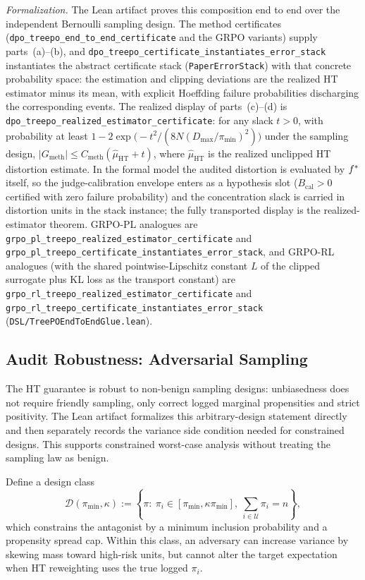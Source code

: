 \noindent\textit{Formalization.} The Lean artifact proves this composition end to end over the independent Bernoulli sampling design. The method certificates (\texttt{dpo\_treepo\_end\_to\_end\_certificate} and the GRPO variants) supply parts~(a)--(b), and \texttt{dpo\_treepo\_certificate\_instantiates\_error\_stack} instantiates the abstract certificate stack (\texttt{PaperErrorStack}) with that concrete probability space: the estimation and clipping deviations are the realized HT estimator minus its mean, with explicit Hoeffding failure probabilities discharging the corresponding events. The realized display of parts~(c)--(d) is \texttt{dpo\_treepo\_realized\_estimator\_certificate}: for any slack $t>0$, with probability at least $1-2\exp\!\big(-t^2/(8N(D_{\max}/\pi_{\min})^2)\big)$ under the sampling design, $|G_{\mathrm{meth}}| \le C_{\mathrm{meth}}(\hat{\mu}_{\mathrm{HT}} + t)$, where $\hat{\mu}_{\mathrm{HT}}$ is the realized unclipped HT distortion estimate. In the formal model the audited distortion is evaluated by $f^\ast$ itself, so the judge-calibration envelope enters as a hypothesis slot ($B_{\mathrm{cal}}>0$ certified with zero failure probability) and the concentration slack is carried in distortion units in the stack instance; the fully transported display is the realized-estimator theorem. GRPO-PL analogues are \texttt{grpo\_pl\_treepo\_realized\_estimator\_certificate} and \texttt{grpo\_pl\_treepo\_certificate\_instantiates\_error\_stack}, and GRPO-RL analogues (with the shared pointwise-Lipschitz constant $L$ of the clipped surrogate plus KL loss as the transport constant) are \texttt{grpo\_rl\_treepo\_realized\_estimator\_certificate} and \texttt{grpo\_rl\_treepo\_certificate\_instantiates\_error\_stack} (\texttt{DSL/TreePOEndToEndGlue.lean}).

\subsection{Audit Robustness: Adversarial Sampling}\label{app:audit-robustness}

The HT guarantee is robust to non-benign sampling designs: unbiasedness does not require friendly sampling, only correct logged marginal propensities and strict positivity. The Lean artifact formalizes this arbitrary-design statement directly and then separately records the variance side condition needed for constrained designs. This supports constrained worst-case analysis without treating the sampling law as benign.

Define a design class
\[
\mathcal{D}(\pi_{\min},\kappa)
:=\left\{\pi:\ \pi_i\in[\pi_{\min},\kappa\pi_{\min}],\ \sum_{i\in\mathcal{U}}\pi_i=n\right\},
\]
which constrains the antagonist by a minimum inclusion probability and a propensity spread cap. Within this class, an adversary can increase variance by skewing mass toward high-risk units, but cannot alter the target expectation when HT reweighting uses the true logged $\pi_i$.

